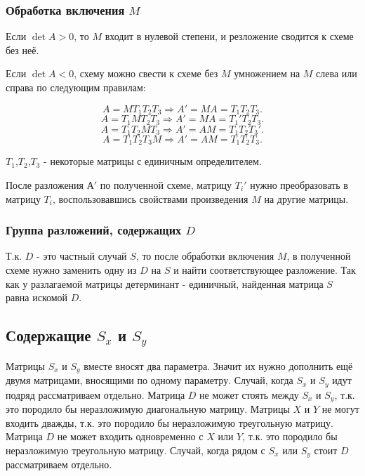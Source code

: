 \subsubsection{Обработка включения $M$}

Если $\det A > 0$, то $M$ входит в нулевой степени, и резложение сводится к схеме без неё.

Если $\det A < 0$, схему можно свести к схеме без $M$ умножением на $M$ слева или справа по следующим правилам:

$$A = MT_1T_2T_3 \Rightarrow A' = MA = T_1T_2T_3.$$
$$A = T_1MT_2T_3 \Rightarrow A' = MA = T_1'T_2T_3.$$
$$A = T_1T_2MT_3 \Rightarrow A' = AM = T_1T_2T_3'.$$
$$A = T_1T_2T_3M \Rightarrow A' = AM = T_1T_2T_3.$$

$T_1$,$T_2$,$T_3$ - некоторые матрицы с единичным определителем.

После разложения $А'$ по полученной схеме, матрицу $T_i'$ нужно преобразовать в матрицу $T_i$, воспользовавшись свойствами произведения $M$ на другие матрицы.

\subsubsection{Группа разложений, содержащих $D$}

Т.к. $D$ - это частный случай $S$, то после обработки включения $M$, в полученной схеме нужно заменить одну из $D$ на $S$ и найти соответствующее разложение. Так как у разлагаемой матрицы детерминант - единичный, найденная матрица $S$ равна искомой $D$.

\subsection{Содержащие $S_x$ и $S_y$}

Матрицы $S_x$ и $S_y$ вместе вносят два параметра. Значит их нужно дополнить ещё двумя матрицами, вносящими по одному параметру.
Случай, когда $S_x$ и $S_y$ идут подряд рассматриваем отдельно.
Матрица $D$ не может стоять между $S_x$ и $S_y$, т.к. это породило бы неразложимую диагональную матрицу.
Матрицы $X$ и $Y$ не могут входить дважды, т.к. это породило бы неразложимую треугольную матрицу.
Матрица $D$ не может входить одновременно с $X$ или $Y$, т.к. это породило бы неразложимую треугольную матрицу.
Случай, когда рядом с $S_x$ или $S_y$ стоит $D$ рассматриваем отдельно.

